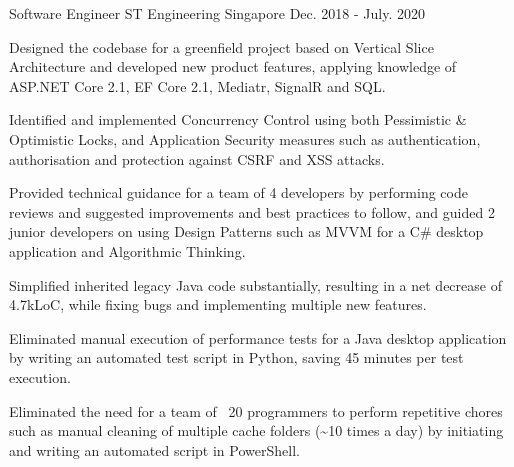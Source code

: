 

\begin{cventries}

  \cventry
    {Software Engineer} %
    {ST Engineering} %
    {Singapore} %
    {Dec. 2018 - July. 2020} %
    {
      \begin{cvitems} %
        \item {Designed the codebase for a greenfield project based on Vertical Slice Architecture and developed new product features, applying knowledge of ASP.NET Core 2.1, EF Core 2.1, Mediatr, SignalR and SQL.}
        \item {Identified and implemented Concurrency Control using both Pessimistic \& Optimistic Locks, and Application Security measures such as authentication, authorisation and protection against CSRF and XSS attacks.}
        \item {Provided technical guidance for a team of 4 developers by performing code reviews and suggested improvements and best practices to follow, and guided 2 junior developers on using Design Patterns such as MVVM for a C\# desktop application and Algorithmic Thinking.}
        \item {Simplified inherited legacy Java code substantially, resulting in a net decrease of 4.7kLoC, while fixing bugs and implementing multiple new features.}
        \item {Eliminated manual execution of performance tests for a Java desktop application by writing an automated test script in Python, saving 45 minutes per test execution.}
        \item {Eliminated the need for a team of ~20 programmers to perform repetitive chores such as manual cleaning of multiple cache folders (\textasciitilde10 times a day) by initiating and writing an automated script in PowerShell.}
      \end{cvitems}
    }


\end{cventries}

